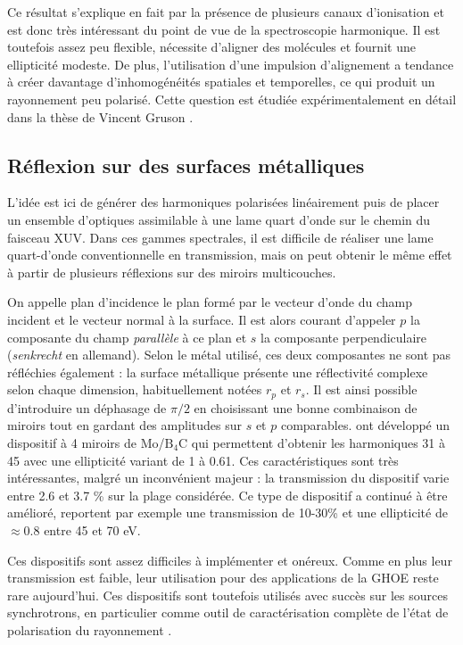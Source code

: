 Ce résultat s'explique en fait par la présence de plusieurs canaux d'ionisation et est donc très intéressant du point de vue de la spectroscopie harmonique. Il est toutefois assez peu flexible, nécessite d'aligner des molécules et fournit une ellipticité modeste. De plus, l'utilisation d'une impulsion d'alignement a tendance à créer davantage d'inhomogénéités spatiales et temporelles, ce qui produit un rayonnement peu polarisé. Cette question est étudiée expérimentalement en détail dans la thèse de Vincent Gruson .


\subsection{Réflexion sur des surfaces métalliques}
\label{sec:metalsurface}
L'idée est ici de générer des harmoniques polarisées linéairement puis de placer un ensemble d'optiques assimilable à une lame quart d'onde sur le chemin du faisceau XUV. Dans ces gammes spectrales, il est difficile de réaliser une lame quart-d'onde conventionnelle en transmission, mais on peut obtenir le même effet à partir de plusieurs réflexions sur des miroirs multicouches. \par
On appelle plan d'incidence le plan formé par le vecteur d'onde du champ incident et le vecteur normal à la surface. Il est alors courant d'appeler $p$ la composante du champ \textit{parallèle} à ce plan et $s$ la composante perpendiculaire (\textit{senkrecht} en allemand). Selon le métal utilisé, ces deux composantes ne sont pas réfléchies également : la surface métallique présente une réflectivité complexe selon chaque dimension, habituellement notées $r_p$ et $r_s$. Il est ainsi possible d'introduire un déphasage de $\pi/2$ en choisissant une bonne combinaison de miroirs tout en gardant des amplitudes sur $s$ et $p$ comparables.  ont développé un dispositif à 4 miroirs de Mo/$\text{B}_\text{4}$C qui permettent d'obtenir les harmoniques 31 à 45 avec une ellipticité variant de 1 à 0.61. Ces caractéristiques sont très intéressantes, malgré un inconvénient majeur : la transmission du dispositif varie entre 2.6 et 3.7 \% sur la plage considérée. Ce type de dispositif a continué à être amélioré,  reportent par exemple une transmission de 10-30\% et une ellipticité de $\approx 0.8$ entre 45 et 70 eV.\par

Ces dispositifs sont assez difficiles à implémenter et onéreux. Comme en plus leur transmission est faible, leur utilisation pour des applications de la GHOE reste rare aujourd'hui. Ces dispositifs sont toutefois utilisés avec succès sur les sources synchrotrons, en particulier comme outil de caractérisation complète de l'état de polarisation du rayonnement . 


